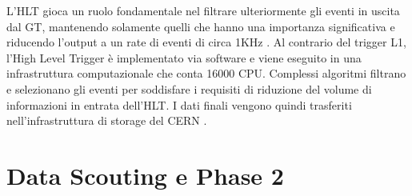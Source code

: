 L'HLT gioca un ruolo fondamentale nel filtrare ulteriormente gli eventi in uscita dal GT, mantenendo solamente quelli che hanno una importanza significativa e riducendo l'output a un rate di eventi di circa 1KHz . Al contrario del trigger L1, l'High Level Trigger è implementato via software e viene eseguito in una infrastruttura computazionale che conta 16000 CPU. \newline
Complessi algoritmi filtrano e selezionano gli eventi per soddisfare i requisiti di riduzione del volume di informazioni in entrata dell'HLT. I dati finali vengono quindi trasferiti nell'infrastruttura di storage del CERN \cite{MasterThesisNicLai}.



\section{Data Scouting e Phase 2}
\label{sec:DataScouting}


